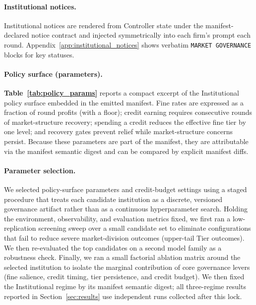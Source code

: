 \documentclass[11pt, a4paper]{article}
\begin{document}
\paragraph{Institutional notices.}
Institutional notices are rendered from Controller state under the manifest-declared notice contract and injected symmetrically into each firm's prompt each round. Appendix~\ref{app:institutional_notices} shows verbatim \texttt{MARKET GOVERNANCE} blocks for key statuses.

\paragraph{Policy surface (parameters).}
\textbf{Table~\ref{tab:policy_params}} reports a compact excerpt of the Institutional policy surface embedded in the emitted manifest. Fine rates are expressed as a fraction of round profits (with a floor); credit earning requires consecutive rounds of market-structure recovery; spending a credit reduces the effective fine tier by one level; and recovery gates prevent relief while market-structure concerns persist. Because these parameters are part of the manifest, they are attributable via the manifest semantic digest and can be compared by explicit manifest diffs.

\paragraph{Parameter selection.}
We selected policy-surface parameters and credit-budget settings using a staged procedure that treats each candidate institution as a discrete, versioned governance artifact rather than as a continuous hyperparameter search. Holding the environment, observability, and evaluation metrics fixed, we first ran a low-replication screening sweep over a small candidate set to eliminate configurations that fail to reduce severe market-division outcomes (upper-tail Tier outcomes). We then re-evaluated the top candidates on a second model family as a robustness check. Finally, we ran a small factorial ablation matrix around the selected institution to isolate the marginal contribution of core governance levers (fine salience, credit timing, tier persistence, and credit budget). We then fixed the Institutional regime by its manifest semantic digest; all three-regime results reported in Section~\ref{sec:results} use independent runs collected after this lock.
\end{document}
